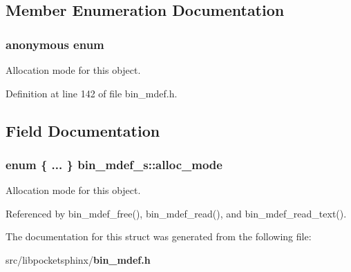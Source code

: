\subsection{Member Enumeration Documentation}
\subsubsection[{anonymous enum}]{\setlength{\rightskip}{0pt plus 5cm}anonymous enum}\label{structbin__mdef__s_aecae45462313d38bc6474d8ee57fe9f3}


Allocation mode for this object. 



Definition at line 142 of file bin\-\_\-mdef.\-h.



\subsection{Field Documentation}
\subsubsection[{alloc\-\_\-mode}]{\setlength{\rightskip}{0pt plus 5cm}enum \{ ... \}   bin\-\_\-mdef\-\_\-s\-::alloc\-\_\-mode}\label{structbin__mdef__s_ab8d852b6cc4f9899da72da03d1607c92}


Allocation mode for this object. 



Referenced by bin\-\_\-mdef\-\_\-free(), bin\-\_\-mdef\-\_\-read(), and bin\-\_\-mdef\-\_\-read\-\_\-text().



The documentation for this struct was generated from the following file\-:\begin{DoxyCompactItemize}
\item 
src/libpocketsphinx/{\bf bin\-\_\-mdef.\-h}\end{DoxyCompactItemize}
